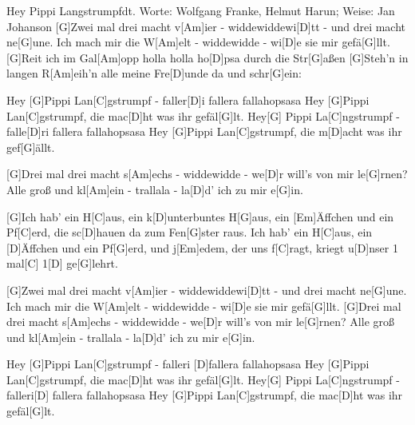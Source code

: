\documentclass[../main.tex]{subfiles}
\begin{document}
\begin{song}[5]{Hey Pippi Langstrumpf}{dt. Worte: Wolfgang Franke, Helmut Harun; Weise: Jan Johanson}{}
[G]Zwei mal drei macht v[Am]ier - widdewiddewi[D]tt - und drei macht ne[G]une.
Ich mach mir die W[Am]elt - widdewidde - wi[D]e sie mir gefä[G]llt.
[G]Reit ich im Gal[Am]opp holla holla ho[D]psa durch die Str[G]aßen
[G]Steh'n in langen R[Am]eih'n alle meine Fre[D]unde da und schr[G]ein:

Hey [G]Pippi Lan[C]gstrumpf - faller[D]i fallera fallahopsasa
Hey [G]Pippi Lan[C]gstrumpf, die mac[D]ht was ihr gefäl[G]lt.
Hey[G] Pippi La[C]ngstrumpf - falle[D]ri fallera fallahopsasa
Hey [G]Pippi Lan[C]gstrumpf, die m[D]acht was ihr gef[G]{ä}llt.

[G]Drei mal drei macht s[Am]echs - widdewidde - we[D]r will's von mir le[G]rnen?
Alle groß und kl[Am]ein - trallala - la[D]d' ich zu mir e[G]in.

[G]Ich hab' ein H[C]aus, ein k[D]unterbuntes H[G]aus,
ein [Em]{Ä}ffchen und ein Pf[C]erd, die sc[D]hauen da zum Fen[G]ster raus.
Ich hab' ein H[C]aus, ein [D]{Ä}ffchen und ein Pf[G]erd,
und j[Em]edem, der uns f[C]ragt, kriegt u[D]nser 1 mal[C] 1[D] ge[G]lehrt.

[G]Zwei mal drei macht v[Am]ier - widdewiddewi[D]tt - und drei macht ne[G]une.
Ich mach mir die W[Am]elt - widdewidde - wi[D]e sie mir gefä[G]llt.
[G]Drei mal drei macht s[Am]echs - widdewidde - we[D]r will's von mir le[G]rnen?
Alle groß und kl[Am]ein - trallala - la[D]d' ich zu mir e[G]in.

Hey [G]Pippi Lan[C]gstrumpf - falleri [D]fallera fallahopsasa
Hey [G]Pippi Lan[C]gstrumpf, die mac[D]ht was ihr gefäl[G]lt.
Hey[G] Pippi La[C]ngstrumpf - falleri[D] fallera fallahopsasa
Hey [G]Pippi Lan[C]gstrumpf, die mac[D]ht was ihr gefäl[G]lt.
\end{song}
\end{document}
